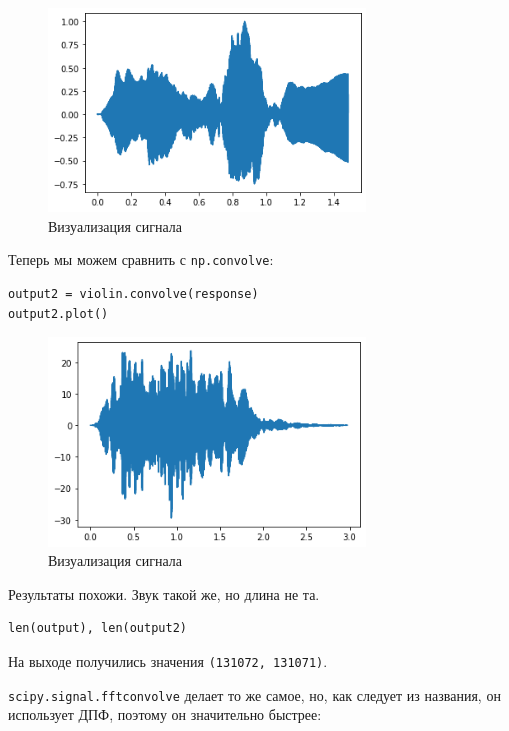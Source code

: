 \documentclass[a4paper,12pt]{report}
\begin{document}
\begin{figure}[H]
        \centering
        \includegraphics[width=0.75\textwidth]{6.png}
        \caption{Визуализация сигнала}
        \label{6}
\end{figure}

Теперь мы можем сравнить с \texttt{np.convolve}:

\begin{lstlisting}[caption=Объединение сигналов]
output2 = violin.convolve(response)
output2.plot()
\end{lstlisting}

\begin{figure}[H]
        \centering
        \includegraphics[width=0.75\textwidth]{7.png}
        \caption{Визуализация сигнала}
        \label{7}
\end{figure}

Результаты похожи. Звук такой же, но длина не та.

\begin{lstlisting}[caption=Сравнение длин сигналов]
len(output), len(output2)
\end{lstlisting}

На выходе получились значения \texttt{(131072, 131071)}.

\texttt{scipy.signal.fftconvolve} делает то же самое, но, как следует из названия, он использует ДПФ, поэтому он значительно быстрее:
\end{document}

